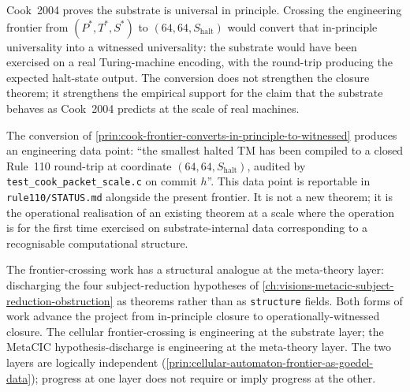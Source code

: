\begin{principle}
\label{prin:cook-frontier-converts-in-principle-to-witnessed}
Cook~2004 proves the substrate is universal in principle. Crossing the engineering frontier from $(P^*, T^*, S^*)$ to $(64, 64, S_{\mathrm{halt}})$ would convert that in-principle universality into a witnessed universality: the substrate would have been exercised on a real Turing-machine encoding, with the round-trip producing the expected halt-state output. The conversion does not strengthen the closure theorem; it strengthens the empirical support for the claim that the substrate behaves as Cook~2004 predicts at the scale of real machines.
\end{principle}

\begin{principle}
\label{prin:cook-frontier-witnessed-is-data}
The conversion of \autoref{prin:cook-frontier-converts-in-principle-to-witnessed} produces an engineering data point: ``the smallest halted TM has been compiled to a closed Rule~110 round-trip at coordinate $(64, 64, S_{\mathrm{halt}})$, audited by \texttt{test\_cook\_packet\_scale.c} on commit $h$''. This data point is reportable in \texttt{rule110/STATUS.md} alongside the present frontier. It is not a new theorem; it is the operational realisation of an existing theorem at a scale where the operation is for the first time exercised on substrate-internal data corresponding to a recognisable computational structure.
\end{principle}

\begin{remark}
\label{rem:cook-frontier-comparison-with-metacic-barrier}
The frontier-crossing work has a structural analogue at the meta-theory layer: discharging the four subject-reduction hypotheses of \autoref{ch:visions-metacic-subject-reduction-obstruction} as theorems rather than as \texttt{structure} fields. Both forms of work advance the project from in-principle closure to operationally-witnessed closure. The cellular frontier-crossing is engineering at the substrate layer; the MetaCIC hypothesis-discharge is engineering at the meta-theory layer. The two layers are logically independent (\autoref{prin:cellular-automaton-frontier-as-goedel-data}); progress at one layer does not require or imply progress at the other.
\end{remark}

